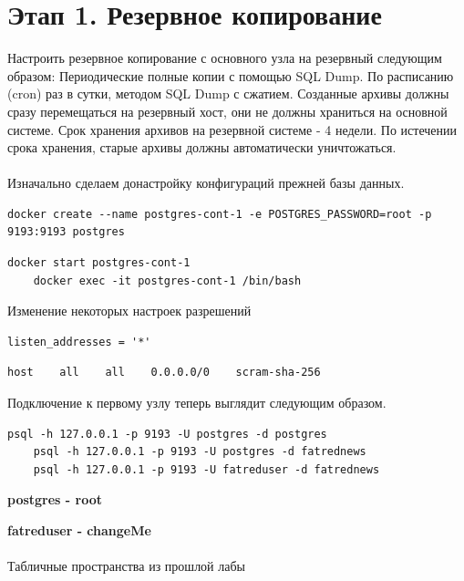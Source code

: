 \documentclass{article}
\begin{document}
\section*{Этап 1. Резервное копирование}
Настроить резервное копирование с основного узла на резервный следующим образом:
Периодические полные копии с помощью SQL Dump.
По расписанию (cron) раз в сутки, методом SQL Dump с сжатием. Созданные архивы должны сразу перемещаться на резервный хост, они не должны храниться на основной системе. Срок хранения архивов на резервной системе - 4 недели. По истечении срока хранения, старые архивы должны автоматически уничтожаться.
\\ \\
Изначально сделаем донастройку конфигураций прежней базы данных.
\begin{lstlisting}[caption={kitty}, label={lst:example}]
    docker create --name postgres-cont-1 -e POSTGRES_PASSWORD=root -p 9193:9193 postgres
\end{lstlisting}

\begin{lstlisting}[caption={kitty}, label={lst:example}]
    docker start postgres-cont-1 
    docker exec -it postgres-cont-1 /bin/bash
\end{lstlisting}

Изменение некоторых настроек разрешений
\begin{lstlisting}[caption={postgresql.conf}, label={lst:example}]
    listen_addresses = '*'
\end{lstlisting}
\begin{lstlisting}[caption={pg\_hba.conf}, label={lst:example}]
    host    all    all    0.0.0.0/0    scram-sha-256
\end{lstlisting}
Подключение к первому узлу теперь выглядит следующим образом.
\begin{lstlisting}[caption={kitty}, label={lst:example}]
    psql -h 127.0.0.1 -p 9193 -U postgres -d postgres 
    psql -h 127.0.0.1 -p 9193 -U postgres -d fatrednews     
    psql -h 127.0.0.1 -p 9193 -U fatreduser -d fatrednews 
\end{lstlisting}

\textbf{postgres - root}

\textbf{fatreduser - changeMe}
\\ \\
Табличные пространства из прошлой лабы
\end{document}
